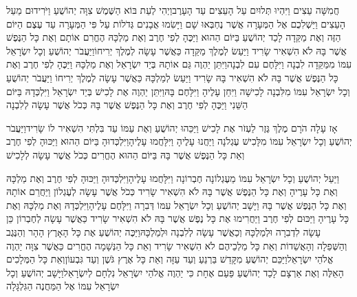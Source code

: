\documentclass[../main/main.tex]{subfiles}
\begin{document}
\begin{multicols*}{\ncols}
חֲמִשָּׁה עֵצִים וַיִּהְיוּ תְּלוּיִם עַל הָעֵצִים עַד הָעָרֶב\PreVerseSpace{}וַיְהִי לְעֵת בּוֹא הַשֶּׁמֶשׁ צִוָּה יְהוֹשֻׁעַ וַיֹּרִידוּם מֵעַל הָעֵצִים וַיַּשְׁלִכֻם אֶל הַמְּעָרָה אֲשֶׁר נֶחְבְּאוּ שָׁם וַיָּשִׂמוּ אֲבָנִים גְּדֹלוֹת עַל פִּי הַמְּעָרָה עַד עֶצֶם הַיּוֹם הַזֶּה \ClosedSection{}וְאֶת מַקֵּדָה לָכַד יְהוֹשֻׁעַ בַּיּוֹם הַהוּא וַיַּכֶּהָ לְפִי חֶרֶב וְאֶת מַלְכָּהּ הֶחֱרִם אוֹתָם וְאֶת כָּל הַנֶּפֶשׁ אֲשֶׁר בָּהּ לֹא הִשְׁאִיר שָׂרִיד וַיַּעַשׂ לְמֶלֶךְ מַקֵּדָה כַּאֲשֶׁר עָשָׂה לְמֶלֶךְ יְרִיחוֹ\PreVerseSpace{}וַיַּעֲבֹר יְהוֹשֻׁעַ וְכָל יִשְׂרָאֵל עִמּוֹ מִמַּקֵּדָה לִבְנָה וַיִּלָּחֶם עִם לִבְנָה\PreVerseSpace{}וַיִּתֵּן יַהְוֶה גַּם אוֹתָהּ בְּיַד יִשְׂרָאֵל וְאֶת מַלְכָּהּ וַיַּכֶּהָ לְפִי חֶרֶב וְאֶת כָּל הַנֶּפֶשׁ אֲשֶׁר בָּהּ לֹא הִשְׁאִיר בָּהּ שָׂרִיד וַיַּעַשׂ לְמַלְכָּהּ כַּאֲשֶׁר עָשָׂה לְמֶלֶךְ יְרִיחוֹ \ClosedSection{}וַיַּעֲבֹר יְהוֹשֻׁעַ וְכָל יִשְׂרָאֵל עִמּוֹ מִלִּבְנָה לָכִישָׁה וַיִּחַן עָלֶיהָ וַיִּלָּחֶם בָּהּ\PreVerseSpace{}וַיִּתֵּן יַהְוֶה אֶת לָכִישׁ בְּיַד יִשְׂרָאֵל וַיִּלְכְּדָהּ בַּיּוֹם הַשֵּׁנִי וַיַּכֶּהָ לְפִי חֶרֶב וְאֶת כָּל הַנֶּפֶשׁ אֲשֶׁר בָּהּ כְּכֹל אֲשֶׁר עָשָׂה לְלִבְנָה\OpenSection{}\par
{}אָז עָלָה הֹרָם מֶלֶךְ גֶּזֶר לַעְזֹר אֶת לָכִישׁ וַיַּכֵּהוּ יְהוֹשֻׁעַ וְאֶת עַמּוֹ עַד בִּלְתִּי הִשְׁאִיר לוֹ שָׂרִיד\PreVerseSpace{}וַיַּעֲבֹר יְהוֹשֻׁעַ וְכָל יִשְׂרָאֵל עִמּוֹ מִלָּכִישׁ עֶגְלֹנָה וַיַּחֲנוּ עָלֶיהָ וַיִּלָּחֲמוּ עָלֶיהָ\PreVerseSpace{}וַיִּלְכְּדוּהָ בַּיּוֹם הַהוּא וַיַּכּוּהָ לְפִי חֶרֶב וְאֵת כָּל הַנֶּפֶשׁ אֲשֶׁר בָּהּ בַּיּוֹם הַהוּא הֶחֱרִים כְּכֹל אֲשֶׁר עָשָׂה לְלָכִישׁ\OpenSection{}\par
{}וַיַּעַל יְהוֹשֻׁעַ וְכָל יִשְׂרָאֵל עִמּוֹ מֵעֶגְלוֹנָה חֶבְרוֹנָה וַיִּלָּחֲמוּ עָלֶיהָ\PreVerseSpace{}וַיִּלְכְּדוּהָ וַיַּכּוּהָ לְפִי חֶרֶב וְאֶת מַלְכָּהּ וְאֶת כָּל עָרֶיהָ וְאֶת כָּל הַנֶּפֶשׁ אֲשֶׁר בָּהּ לֹא הִשְׁאִיר שָׂרִיד כְּכֹל אֲשֶׁר עָשָׂה לְעֶגְלוֹן וַיַּחֲרֵם אוֹתָהּ וְאֶת כָּל הַנֶּפֶשׁ אֲשֶׁר בָּהּ \ClosedSection{}וַיָּשָׁב יְהוֹשֻׁעַ וְכָל יִשְׂרָאֵל עִמּוֹ דְּבִרָה וַיִּלָּחֶם עָלֶיהָ\PreVerseSpace{}וַיִּלְכְּדָהּ וְאֶת מַלְכָּהּ וְאֶת כָּל עָרֶיהָ וַיַּכּוּם לְפִי חֶרֶב וַיַּחֲרִימוּ אֶת כָּל נֶפֶשׁ אֲשֶׁר בָּהּ לֹא הִשְׁאִיר שָׂרִיד כַּאֲשֶׁר עָשָׂה לְחֶבְרוֹן כֵּן עָשָׂה לִדְבִרָה וּלְמַלְכָּהּ וְכַאֲשֶׁר עָשָׂה לְלִבְנָה וּלְמַלְכָּהּ\PreVerseSpace{}וַיַּכֶּה יְהוֹשֻׁעַ אֶת כָּל הָאָרֶץ הָהָר וְהַנֶּגֶב וְהַשְּׁפֵלָה וְהָאֲשֵׁדוֹת וְאֵת כָּל מַלְכֵיהֶם לֹא הִשְׁאִיר שָׂרִיד וְאֵת כָּל הַנְּשָׁמָה הֶחֱרִים כַּאֲשֶׁר צִוָּה יַהְוֶה אֱלֹהֵי יִשְׂרָאֵל\PreVerseSpace{}וַיַּכֵּם יְהוֹשֻׁעַ מִקָּדֵשׁ בַּרְנֵעַ וְעַד עַזָּה וְאֵת כָּל אֶרֶץ גֹּשֶׁן וְעַד גִּבְעוֹן\PreVerseSpace{}וְאֵת כָּל הַמְּלָכִים הָאֵלֶּה וְאֶת אַרְצָם לָכַד יְהוֹשֻׁעַ פַּעַם אֶחָת כִּי יַהְוֶה אֱלֹהֵי יִשְׂרָאֵל נִלְחָם לְיִשְׂרָאֵל\PreVerseSpace{}וַיָּשָׁב יְהוֹשֻׁעַ וְכָל יִשְׂרָאֵל עִמּוֹ אֶל הַמַּחֲנֶה הַגִּלְגָּלָה\OpenSection{}\par

\end{multicols*}
\end{document}
